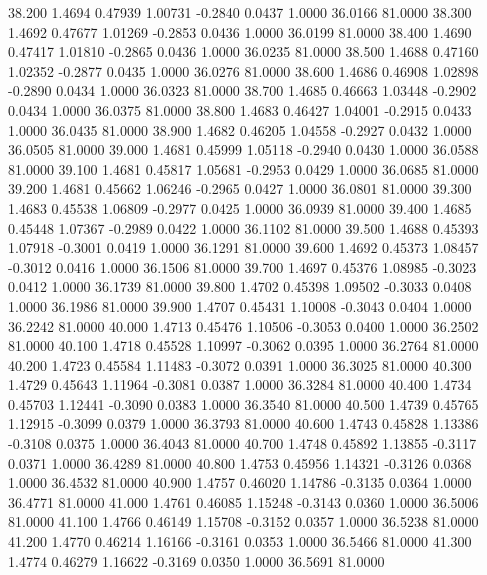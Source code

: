   38.200   1.4694   0.47939   1.00731  -0.2840   0.0437   1.0000  36.0166  81.0000
  38.300   1.4692   0.47677   1.01269  -0.2853   0.0436   1.0000  36.0199  81.0000
  38.400   1.4690   0.47417   1.01810  -0.2865   0.0436   1.0000  36.0235  81.0000
  38.500   1.4688   0.47160   1.02352  -0.2877   0.0435   1.0000  36.0276  81.0000
  38.600   1.4686   0.46908   1.02898  -0.2890   0.0434   1.0000  36.0323  81.0000
  38.700   1.4685   0.46663   1.03448  -0.2902   0.0434   1.0000  36.0375  81.0000
  38.800   1.4683   0.46427   1.04001  -0.2915   0.0433   1.0000  36.0435  81.0000
  38.900   1.4682   0.46205   1.04558  -0.2927   0.0432   1.0000  36.0505  81.0000
  39.000   1.4681   0.45999   1.05118  -0.2940   0.0430   1.0000  36.0588  81.0000
  39.100   1.4681   0.45817   1.05681  -0.2953   0.0429   1.0000  36.0685  81.0000
  39.200   1.4681   0.45662   1.06246  -0.2965   0.0427   1.0000  36.0801  81.0000
  39.300   1.4683   0.45538   1.06809  -0.2977   0.0425   1.0000  36.0939  81.0000
  39.400   1.4685   0.45448   1.07367  -0.2989   0.0422   1.0000  36.1102  81.0000
  39.500   1.4688   0.45393   1.07918  -0.3001   0.0419   1.0000  36.1291  81.0000
  39.600   1.4692   0.45373   1.08457  -0.3012   0.0416   1.0000  36.1506  81.0000
  39.700   1.4697   0.45376   1.08985  -0.3023   0.0412   1.0000  36.1739  81.0000
  39.800   1.4702   0.45398   1.09502  -0.3033   0.0408   1.0000  36.1986  81.0000
  39.900   1.4707   0.45431   1.10008  -0.3043   0.0404   1.0000  36.2242  81.0000
  40.000   1.4713   0.45476   1.10506  -0.3053   0.0400   1.0000  36.2502  81.0000
  40.100   1.4718   0.45528   1.10997  -0.3062   0.0395   1.0000  36.2764  81.0000
  40.200   1.4723   0.45584   1.11483  -0.3072   0.0391   1.0000  36.3025  81.0000
  40.300   1.4729   0.45643   1.11964  -0.3081   0.0387   1.0000  36.3284  81.0000
  40.400   1.4734   0.45703   1.12441  -0.3090   0.0383   1.0000  36.3540  81.0000
  40.500   1.4739   0.45765   1.12915  -0.3099   0.0379   1.0000  36.3793  81.0000
  40.600   1.4743   0.45828   1.13386  -0.3108   0.0375   1.0000  36.4043  81.0000
  40.700   1.4748   0.45892   1.13855  -0.3117   0.0371   1.0000  36.4289  81.0000
  40.800   1.4753   0.45956   1.14321  -0.3126   0.0368   1.0000  36.4532  81.0000
  40.900   1.4757   0.46020   1.14786  -0.3135   0.0364   1.0000  36.4771  81.0000
  41.000   1.4761   0.46085   1.15248  -0.3143   0.0360   1.0000  36.5006  81.0000
  41.100   1.4766   0.46149   1.15708  -0.3152   0.0357   1.0000  36.5238  81.0000
  41.200   1.4770   0.46214   1.16166  -0.3161   0.0353   1.0000  36.5466  81.0000
  41.300   1.4774   0.46279   1.16622  -0.3169   0.0350   1.0000  36.5691  81.0000
